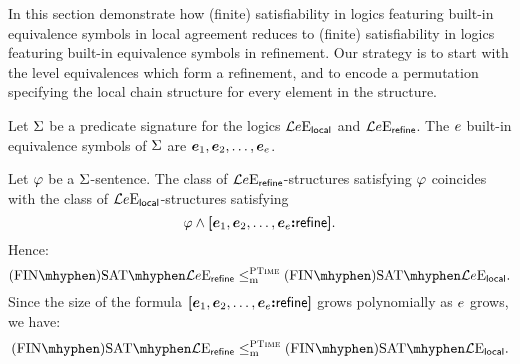 
In this section demonstrate how (finite) satisfiability in logics featuring
built-in equivalence symbols in local agreement reduces to (finite)
satisfiability in logics featuring built-in equivalence symbols in refinement.
Our strategy is to start with the level equivalences which form a refinement,
and to encode a permutation specifying the local chain structure for every
element in the structure.

Let $\mathrm{\Sigma}$ be a predicate signature for the logics $\mathcal{L}{e}\mathrm{E}_{\mathsf{local}}$ and
$\mathcal{L}{e}\mathrm{E}_{\mathsf{refine}}$. The $e$ built-in equivalence symbols of $\mathrm{\Sigma}$ are
$\bm{e}_{1}, \bm{e}_{2}, \dots, \bm{e}_{e}$.

Let $\varphi$ be a $\mathrm{\Sigma}$-sentence.
The class of $\mathcal{L}{e}\mathrm{E}_{\mathsf{refine}}$-structures satisfying $\varphi$ coincides with
the class of $\mathcal{L}{e}\mathrm{E}_{\mathsf{local}}$-structures satisfying
\[
  \varphi \land {\bm{[}\bm{e}_{1},\bm{e}_{2},\dots,\bm{e}_{e}\mathord{\bm{:}}\mathsf{refine}\bm{]}}.
\] 
Hence:
\[
  \FinASat{\Fo\Eea\sze\agrefine} \red\cP
  \FinASat{\Fo\Eea\sze\aglocal}.
\]
Since the size of the formula ${\bm{[}\bm{e}_{1},\bm{e}_{2},\dots,\bm{e}_{e}\mathord{\bm{:}}\mathsf{refine}\bm{]}}$ grows 
polynomially as $e$ grows, we have:
\[
  \FinASat{\Fo\Eea\nosze\agrefine} \red\cP
  \FinASat{\Fo\Eea\nosze\aglocal}.
\]


